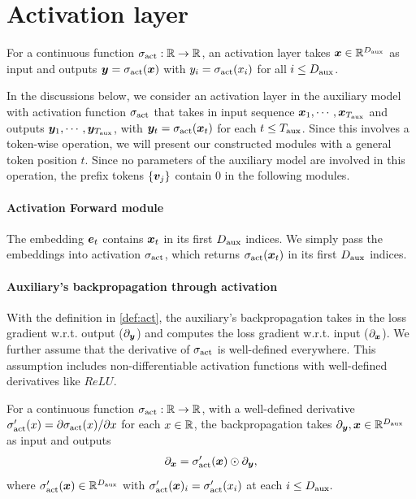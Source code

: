 \section{Activation layer}\label{sec:act_appendix}


\begin{definition}\label{def:act}
    For a continuous function $\sigma_{\textrm{act}}: \mathbb{R} \to \mathbb{R}$,  an activation layer takes ${\bm{x}}\in\mathbb{R}^{D_{\text{aux}}}$ as input and outputs ${\bm{y}} = \sigma_{\textrm{act}}({\bm{x}})$ with $ y_i = \sigma_{\textrm{act}} (x_i) $ for all $i \le D_{\text{aux}}$.
\end{definition}

  In the discussions below, we consider an activation layer in the auxiliary model with activation function $\sigma_{\textrm{act}}$ that takes in input sequence ${\bm{x}}_1, \cdots, {\bm{x}}_{T_{\text{aux}}}$ and outputs ${\bm{y}}_1, \cdots, {\bm{y}}_{T_{\text{aux}}}$, with ${\bm{y}}_t =\sigma_{\textrm{act}}({\bm{x}}_t)$ for each $t \le {T_{\text{aux}}}$. Since this involves a token-wise operation, we will present our constructed modules with a general token position $t$. Since no parameters of the auxiliary model are involved in this operation, the prefix tokens $\{ {\bm{v}}_j \}$ contain $0$ in the following modules.

\paragraph{\simulator{} Activation Forward module} The embedding $\ve_t$ contains ${\bm{x}}_t$ in its first $D_{\text{aux}}$ indices. We simply pass the embeddings into activation $\sigma_{\textrm{act}}$, which returns $\sigma_{\textrm{act}}({\bm{x}}_t)$ in its first $D_{\text{aux}}$ indices.



\paragraph{Auxiliary's backpropagation through activation} With the definition in \cref{def:act}, the auxiliary's backpropagation takes in the loss gradient w.r.t. output ($\partial_{{\bm{y}}}$) and computes the loss gradient  w.r.t. input ($\partial_{{\bm{x}}}$). We further assume that the derivative of $\sigma_{\textrm{act}}$ is well-defined everywhere. This assumption includes non-differentiable activation functions with well-defined derivatives like $ReLU$.

\begin{definition}\label{def:act_backprop}
   For a continuous function $\sigma_{\textrm{act}}: \mathbb{R} \to \mathbb{R}$, with a well-defined derivative $\sigma_{\textrm{act}}'(x) = \partial \sigma_{\textrm{act}}(x) / \partial x$ for each $x \in \mathbb{R}$,  the backpropagation takes $\partial_{ {\bm{y}} }, {\bm{x}} \in\mathbb{R}^{D_{\text{aux}}}$ as input and outputs
    \begin{align*}
        \partial_{ {\bm{x}} } = \sigma_{\textrm{act}}'({\bm{x}}) \odot \partial_{{\bm{y}}},
    \end{align*}
    where $\sigma_{\textrm{act}}'({\bm{x}}) \in \mathbb{R}^{D_{\text{aux}}}$ with $\sigma_{\textrm{act}}'({\bm{x}})_i = \sigma_{\textrm{act}}'(x_i)$ at each $i \le D_{\text{aux}}.$  
\end{definition}

